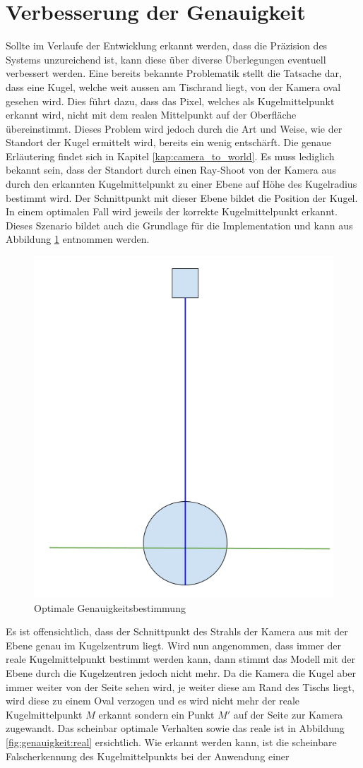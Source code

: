 \section{Verbesserung der Genauigkeit}
Sollte im Verlaufe der Entwicklung erkannt werden, dass die Präzision des Systems unzureichend
ist, kann diese über diverse Überlegungen eventuell verbessert werden. Eine bereits bekannte Problematik
stellt die Tatsache dar, dass eine Kugel, welche weit aussen am Tischrand liegt, von der Kamera oval gesehen wird.
Dies führt dazu, dass das Pixel, welches als Kugelmittelpunkt erkannt wird, nicht mit dem realen Mittelpunkt auf der Oberfläche übereinstimmt.
Dieses Problem wird jedoch durch die Art und Weise, wie der Standort der Kugel ermittelt wird, bereits ein wenig entschärft.
Die genaue Erläutering findet sich in Kapitel \ref{kap:camera_to_world}.
Es muss lediglich bekannt sein, dass der Standort durch einen Ray-Shoot von der Kamera aus durch den erkannten Kugelmittelpunkt
zu einer Ebene auf Höhe des Kugelradius bestimmt wird. Der Schnittpunkt mit dieser Ebene bildet die Position der Kugel. In einem optimalen Fall
wird jeweils der korrekte Kugelmittelpunkt erkannt. Dieses Szenario bildet auch die Grundlage für die Implementation und kann
aus Abbildung \ref{fig:genauigkeit:optimal} entnommen werden.
\begin{figure}[h!]
    \includegraphics[width=0.2\linewidth]{../common/05_further_work/resources/00_genauigkeit_optimal.png}
    \caption{Optimale Genauigkeitsbestimmung}
    \label{fig:genauigkeit:optimal}
\end{figure}
Es ist offensichtlich, dass der Schnittpunkt des Strahls der Kamera aus mit der Ebene genau im Kugelzentrum liegt.
Wird nun angenommen, dass immer der reale Kugelmittelpunkt bestimmt werden kann, dann stimmt das Modell mit der Ebene
durch die Kugelzentren jedoch nicht mehr. Da die Kamera die Kugel aber immer weiter von der Seite sehen wird, je weiter diese am Rand
des Tischs liegt, wird diese zu einem Oval verzogen und es wird nicht mehr der reale Kugelmittelpunkt $M$ erkannt sondern ein Punkt $M'$
auf der Seite zur Kamera zugewandt. Das scheinbar optimale Verhalten sowie das reale ist in Abbildung \ref{fig:genauigkeit:real}
ersichtlich. Wie erkannt werden kann, ist die scheinbare Falscherkennung des Kugelmittelpunkts bei der Anwendung einer
